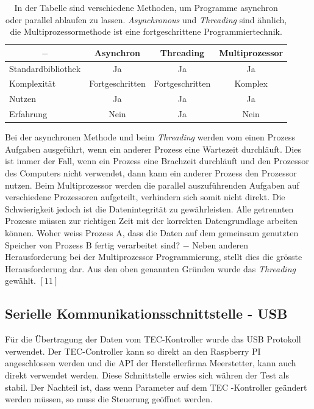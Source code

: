 \begin{table}[H]
    \centering
    \begin{tabular}{l|c|c|c}
         \multicolumn{1}{c|}{$-$}&   \textbf{Asynchron}& \textbf{Threading}& \textbf{Multiprozessor}\\
         \hline
         Standardbibliothek&        Ja&                 Ja&                 Ja\\
         Komplexität&               Fortgeschritten&    Fortgeschritten&    Komplex\\
         Nutzen&                    Ja&                 Ja&                 Ja\\
         Erfahrung&                 Nein&               Ja&                 Nein
    \end{tabular}
    \caption{In der Tabelle sind verschiedene Methoden, um Programme asynchron oder parallel ablaufen zu lassen. \textit{Asynchronous} und \textit{Threading} sind ähnlich, die Multiprozessormethode ist eine fortgeschrittene Programmiertechnik.}
    \label{tab:async_threading_multiprocessor}
\end{table}

Bei der asynchronen Methode und beim \textit{Threading} werden vom einen Prozess Aufgaben ausgeführt, wenn ein anderer Prozess eine Wartezeit durchläuft. Dies ist immer der Fall, wenn ein Prozess eine Brachzeit durchläuft und  den Prozessor des Computers nicht verwendet, dann kann ein anderer Prozess den Prozessor nutzen. Beim Multiprozessor werden die parallel auszuführenden Aufgaben auf verschiedene Prozessoren aufgeteilt, verhindern sich somit nicht direkt. Die Schwierigkeit jedoch ist die Datenintegrität zu gewährleisten. Alle getrennten Prozesse müssen zur richtigen Zeit mit der korrekten Datengrundlage arbeiten können. Woher weiss Prozess A, dass die Daten auf dem gemeinsam genutzten Speicher von Prozess B fertig verarbeitet sind? $-$ Neben anderen Herausforderung bei der Multiprozessor Programmierung, stellt dies die grösste Herausforderung dar. Aus den oben genannten Gründen wurde das \textit{Threading} gewählt. $[11]$


\subsection{Serielle Kommunikationsschnittstelle - USB}
Für die Übertragung der Daten vom TEC-Kontroller wurde das USB Protokoll verwendet. Der TEC-Controller kann so direkt an den Raspberry PI angeschlossen werden und die API der Herstellerfirma Meerstetter, kann auch direkt verwendet werden. Diese Schnittstelle erwies sich währen der Test als stabil. Der Nachteil ist, dass wenn Parameter auf dem TEC -Kontroller geändert werden müssen, so muss die Steuerung geöffnet werden.

\nocite{*}